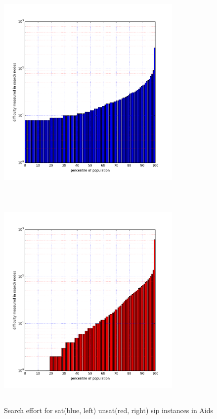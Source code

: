 \documentclass{l4proj}
\begin{document}
\begin{figure}
\centering
\begin{minipage}[t]{.5\textwidth}
  \centering
  \includegraphics[height=11cm,width=9cm]{images/plots/aidsSAT.png}
\end{minipage}%
\begin{minipage}[t]{.5\textwidth}
  \centering
  \includegraphics[height=11cm,width=9cm]{images/plots/aidsUNSAT.png}
\end{minipage}
\caption{Search effort for \gls{sat}(blue, left) \gls{unsat}(red, right) \gls{sip} instances in Aids}
\label{fig:aidsSatUnsat}
\end{figure}
\end{document}
